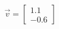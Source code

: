 \documentclass[preview]{standalone}
\begin{document}
\begin{align*}
\vec{v}=\begin{bmatrix}1.1\\-0.6\end{bmatrix}
\end{align*}
\end{document}
